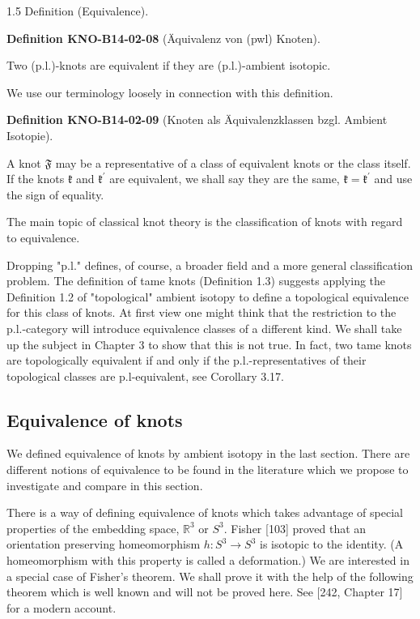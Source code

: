 \documentclass[10pt, letterpaper]{article}
\newcommand{\CustomHeading}[3]{%
  \par\medskip\noindent%
  \textbf{#1 #2} \textnormal{(#3)}.\enskip%
}
\newenvironment{DEF}[2]{\begin{unitbox}\CustomHeading{Definition}{#1}{#2}}{\end{unitbox}}
\begin{document}
1.5 Definition (Equivalence). 

\begin{DEF}{KNO-B14-02-08}{Äquivalenz von (pwl) Knoten}
Two (p.l.)-knots are equivalent if they are (p.l.)-ambient isotopic.
\end{DEF}

We use our terminology loosely in connection with this definition. 

\begin{DEF}{KNO-B14-02-09}{Knoten als Äquivalenzklassen bzgl. Ambient Isotopie}
A knot $\mathfrak{F}$ may be a representative of a class of equivalent knots or the class itself. If the knots $\mathfrak{k}$ and $\mathfrak{k}^{\prime}$ are equivalent, we shall say they are the same, $\mathfrak{k}=\mathfrak{k}^{\prime}$ and use the sign of equality.
\end{DEF}

The main topic of classical knot theory is the classification of knots with regard to equivalence.

Dropping "p.l." defines, of course, a broader field and a more general classification problem. The definition of tame knots (Definition 1.3) suggests applying the Definition 1.2 of "topological" ambient isotopy to define a topological equivalence for this class of knots. At first view one might think that the restriction to the p.l.-category will introduce equivalence classes of a different kind. We shall take up the subject in Chapter 3 to show that this is not true. In fact, two tame knots are topologically equivalent if and only if the p.l.-representatives of their topological classes are p.l-equivalent, see Corollary 3.17.


\subsection{Equivalence of knots}
We defined equivalence of knots by ambient isotopy in the last section. There are different notions of equivalence to be found in the literature which we propose to investigate and compare in this section.

There is a way of defining equivalence of knots which takes advantage of special properties of the embedding space, $\mathbb{R}^{3}$ or $S^{3}$. Fisher [103] proved that an orientation preserving homeomorphism $h: S^{3} \rightarrow S^{3}$ is isotopic to the identity. (A homeomorphism with this property is called a deformation.) We are interested in a special case of Fisher's theorem. We shall prove it with the help of the following theorem which is well known and will not be proved here. See [242, Chapter 17] for a modern account.\\[0pt]
\end{document}
